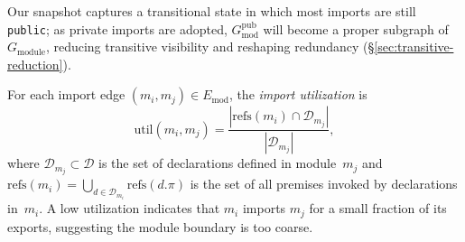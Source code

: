 \noindent Our snapshot captures a transitional state in which most imports are still \texttt{public}; as private imports are adopted, $G_{\mathrm{mod}}^{\mathrm{pub}}$ will become a proper subgraph of $G_{\mathrm{module}}$, reducing transitive visibility and reshaping redundancy (\S\ref{sec:transitive-reduction}).

\begin{definition}\label{def:import-util}
For each import edge $(m_i, m_j) \in E_{\mathrm{mod}}$, the \emph{import utilization} is
\[
  \mathrm{util}(m_i, m_j) = \frac{|\mathrm{refs}(m_i) \cap \mathcal{D}_{m_j}|}{|\mathcal{D}_{m_j}|},
\]
where $\mathcal{D}_{m_j} \subset \mathcal{D}$ is the set of declarations defined in module~$m_j$ and $\mathrm{refs}(m_i) = \bigcup_{d \in \mathcal{D}_{m_i}} \mathrm{refs}(d.\pi)$ is the set of all premises invoked by declarations in~$m_i$. A low utilization indicates that $m_i$ imports $m_j$ for a small fraction of its exports, suggesting the module boundary is too coarse.
\end{definition}

